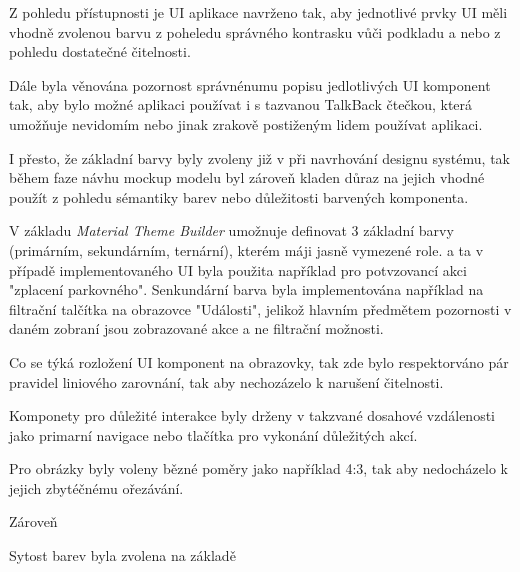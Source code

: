 \begin{minipage}[t]{0.45\textwidth}

\bigskip
{}
Z pohledu přístupnosti je UI aplikace navrženo tak, aby jednotlivé prvky UI měli vhodně zvolenou barvu z poheledu
správného kontrasku vůči podkladu a nebo z pohledu dostatečné čitelnosti.

Dále byla věnována pozornost správnénumu popisu jedlotlivých UI komponent tak, aby bylo možné aplikaci používat i s tazvanou TalkBack čtečkou, která 
umožňuje nevidomím nebo jinak zrakově postiženým lidem používat aplikaci.

\bigskip
{}
I přesto, že základní barvy byly zvoleny již v při navrhování designu systému, tak během faze návhu mockup modelu byl zároveň kladen důraz na  jejich 
vhodné použít z pohledu sémantiky barev nebo důležitosti barvených komponenta.

V základu \textit{Material Theme Builder} umožnuje definovat 3 základní barvy (primárním, sekundárním, ternární), kterém máji jasně vymezené role.
a ta v případě implementovaného UI byla použita například pro potvzovancí akci "zplacení parkovného". Senkundární barva byla
implementována například na filtrační talčítka na obrazovce "Události", jelikož hlavním předmětem pozornosti v daném zobraní 
jsou zobrazované akce a ne filtrační možnosti.

\bigskip

Co se týká rozložení UI komponent na obrazovky, tak zde bylo respektorváno pár pravidel liniového zarovnání, tak aby nechozázelo
k narušení čitelnosti.

Komponety pro důležité interakce byly drženy v takzvané dosahové vzdálenosti jako primarní navigace nebo tlačítka pro vykonání
důležitých akcí.

Pro obrázky byly voleny bězné poměry jako například 4:3, tak aby nedocházelo k jejich zbytéčnému ořezávání.

Zároveň 

 Sytost barev byla zvolena na základě
\end{minipage}
\hfill
